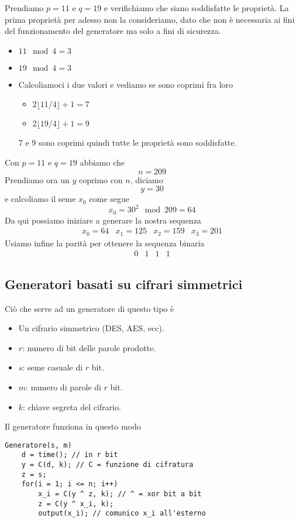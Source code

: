 \begin{example}
	Prendiamo $p = 11$ e $q = 19$ e verifichiamo che siano soddisfatte le propriet\`a. La prima propriet\`a per adesso
	non la consideriamo, dato che non \`e necessaria ai fini del funzionamento del generatore ma solo a fini di sicurezza.
	\begin{itemize}
		\item $11 \mod{4} = 3$
		\item $19 \mod{4} = 3$
		\item Calcoliamoci i due valori e vediamo se sono coprimi fra loro
		      \begin{itemize}
			      \item $2 \lfloor 11 / 4 \rfloor + 1 = 7$
			      \item $2 \lfloor 19 / 4 \rfloor + 1 = 9$
		      \end{itemize}
		      7 e 9 sono coprimi quindi tutte le propriet\`a sono soddisfatte.
	\end{itemize}
	Con $p = 11$ e $q = 19$ abbiamo che
	\[ n = 209 \]
	Prendiamo ora un $y$ coprimo con $n$, diciamo
	\[ y = 30 \]
	e calcoliamo il seme $x_0$ come segue
	\[ x_0 = 30^2 \mod{209} = 64 \]
	Da qui possiamo iniziare a generare la nostra sequenza
	\[ \begin{matrix} x_0 = 64 & x_1 = 125 & x_2 = 159 & x_3 = 201 \end{matrix} \]
	Usiamo infine la parit\`a per ottenere la sequenza binaria
	\[ \begin{matrix} 0 & 1 & 1 & 1 \end{matrix} \]
\end{example}

\subsection{Generatori basati su cifrari simmetrici}
Ci\`o che serve ad un generatore di questo tipo \`e
\begin{itemize}
	\item Un cifrario simmetrico (DES, AES, ecc).
	\item $r$: numero di bit delle parole prodotte.
	\item $s$: seme casuale di $r$ bit.
	\item $m$: numero di parole di $r$ bit.
	\item $k$: chiave segreta del cifrario.
\end{itemize}
Il generatore funziona in questo modo
\begin{lstlisting}[style=pseudo-style]
Generatore(s, m)
	d = time(); // in r bit 
	y = C(d, k); // C = funzione di cifratura 
	z = s;
	for(i = 1; i <= n; i++)
		x_i = C(y ^ z, k); // ^ = xor bit a bit
		z = C(y ^ x_i, k);
		output(x_i); // comunico x_i all'esterno
\end{lstlisting}